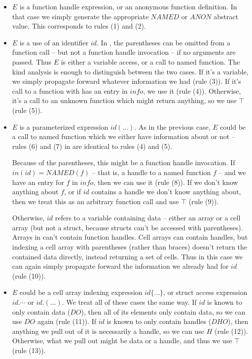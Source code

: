 \begin{itemize}

  \item $E$ is a function handle expression, or an anonymous function
    definition. In that case we simply generate the appropriate $NAMED$ or
    $ANON$ abstract value. This corresponds to rules (1) and (2).

  \item $E$ is a use of an identifier $id$. In \matlab, the parentheses can be
    omitted from a function call -- but not a function handle invocation -- if
    no arguments are passed. Thus $E$ is either a variable access, or a call to
    named function. The kind analysis is enough to distinguish between the two
    cases. If it's a variable, we simply propagate forward whatever information
    we had (rule (3)). If it's call to a function with has an entry in $info$,
    we use it (rule (4)). Otherwise, it's a call to an unknown function which
    might return anything, so we use $\top$ (rule (5)).

  \item $E$ is a parameterized expression $id(\dots)$. As in the previous case,
    $E$ could be a call to named function which we either have information
    about or not -- rules (6) and (7) in  are
    identical to rules (4) and (5).

    Because of the parentheses, this might be a function handle invocation. If
    $in(id) = NAMED(f)$ -- that is, a handle to a named function $f$ -- and we
    have an entry for $f$ in $info$, then we can use it (rule (8)). If we don't
    know anything about $f$, or if $id$ contains a handle we don't know
    anything about, then we treat this as an arbitrary function call and use
    $\top$ (rule (9)).

    Otherwise, $id$ refers to a variable containing data -- either an array or
    a cell array (but not a struct, because structs can't be accessed with
    parentheses). Arrays in \matlab can't contain function handles. Cell arrays
    can contain handles, but indexing a cell array with parentheses (rather
    than braces) doesn't return the contained data directly, instead returning
    a set of cells. Thus in this case we can again simply propagate forward the
    information we already had for $id$ (rule (10)).

  \item $E$ could be a cell array indexing expression $id\lbrace\dots\rbrace$,
    or struct access expression $id.\cdots$ or $id.(\dots)$. We treat all of
    these cases the same way. If $id$ is known to only contain data ($DO$),
    then all of its elements only contain data, so we can use $DO$ again (rule
    (11)). If $id$ is known to only contain handles ($DHO$), then anything we
    pull out of it is necessarily a handle, so we can use $H$ (rule (12)).
    Otherwise, what we pull out might be data or a handle, and thus we use
    $\top$ (rule (13)).


\end{itemize}
